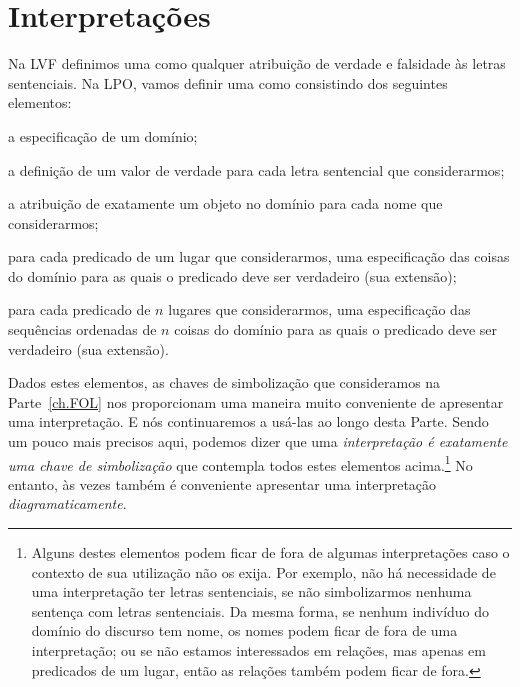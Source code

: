 \section{Interpretações}\label{s:Interpret}
Na LVF definimos uma  como qualquer atribuição de verdade e falsidade às letras sentenciais.
Na LPO, vamos definir uma  como consistindo dos seguintes elementos:
	\begin{ebullet}	
		\item a especificação de um domínio;
		\item a definição de um valor de verdade para cada letra sentencial que considerarmos;
		\item a atribuição de exatamente um objeto no domínio para cada nome que considerarmos;
		\item para cada predicado de um lugar que considerarmos, uma especificação das coisas do domínio para as quais o predicado deve ser verdadeiro (sua extensão);
		\item para cada predicado de $n$ lugares que considerarmos, uma especificação das sequências ordenadas de $n$ coisas do domínio  para as quais o predicado deve ser verdadeiro (sua extensão).
	\end{ebullet}
Dados estes elementos, as chaves de simbolização que consideramos na Parte~\ref{ch.FOL} nos proporcionam uma maneira muito conveniente de apresentar uma interpretação.
E nós continuaremos a usá-las ao longo desta Parte.
Sendo um pouco mais precisos aqui, podemos dizer que uma \emph{interpretação é exatamente uma chave de simbolização} que contempla todos estes elementos acima.\footnote{
	Alguns destes elementos podem ficar de fora de algumas interpretações caso o contexto de sua utilização não os exija. Por exemplo, não há necessidade de uma interpretação ter letras sentenciais, se não simbolizarmos nenhuma sentença com letras sentenciais. Da mesma forma, se nenhum indivíduo do domínio do discurso tem nome, os nomes podem ficar de fora de uma interpretação; ou se não estamos interessados em relações, mas apenas em predicados de um lugar, então as relações também podem ficar de fora.}
No entanto, às vezes também é conveniente apresentar uma interpretação \emph{diagramaticamente}.

